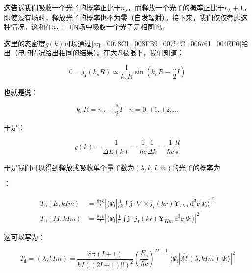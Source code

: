 这告诉我们吸收一个光子的概率正比于$n_{\lambda}$，而释放一个光子的概率正比于$n_{\lambda}+1$。即使没有场时，释放光子的概率也不为零（自发辐射）。接下来，我们仅仅考虑这种情况。这和在$n_{\lambda}=1$的场中吸收一个光子是相同的。

这里的态密度$g(k)$可以通过\ref{eq:=0078C1=008FB9=00754C=006761=004EF6}给出（电的情况给出相同的结果）。在大$R$极限下，我们知道：

\begin{equation}
0=j_{I}(k_{n}R)\simeq\frac{1}{k_{n}R}\sin\left(k_{n}R-\frac{\mathrm{\pi}}{2}I\right)
\end{equation}

也就是说：

\begin{equation}
k_{n}R=n\mathrm{\pi}+\frac{\mathrm{\pi}}{2}I\quad n=0,\pm1,\pm2,\dots
\end{equation}

于是：

\begin{equation}
g(k)=\frac{1}{\Delta E(k)}=\frac{1}{\hbar c}\frac{1}{\Delta k}=\frac{1}{\hbar c}\frac{R}{\mathrm{\pi}}
\end{equation}

于是我们可以得到释放或吸收单个量子数为$(\lambda,k,I,m)$的光子的概率为

：

\begin{align}
T_{\text{fi}}(E,kIm) & =\frac{8\mathrm{\pi}k}{\hbar}\left|\langle\Psi_{\text{f}}|\frac{1}{ck}\int\boldsymbol{j}\cdot\nabla\times j_{I}(kr)\boldsymbol{Y}_{IIm}\,\mathrm{d}^{3}\boldsymbol{r}|\Psi_{\text{i}}\rangle\right|^{2}\\
T_{\text{fi}}(M,kIm) & =\frac{8\mathrm{\pi}k}{\hbar}\left|\langle\Psi_{\text{f}}|\frac{1}{c}\int\boldsymbol{j}\cdot j_{I}(kr)\boldsymbol{Y}_{IIm}\,\mathrm{d}^{3}\boldsymbol{r}|\Psi_{\text{i}}\rangle\right|^{2}
\end{align}

这可以写为：

\begin{equation}
T_{\text{fi}}=(\lambda,kIm)=\frac{8\mathrm{\pi}(I+1)}{\hbar I((2I+1)!!)^{2}}\left(\frac{E_{\gamma}}{\hbar c}\right)^{2I+1}\left|\langle\Psi_{\text{f}}|\hat{\mathcal{M}}(\lambda,kIm)|\Psi_{\text{i}}\rangle\right|^{2}
\end{equation}

